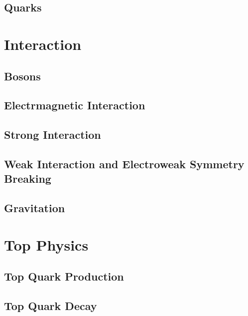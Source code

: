 % 
% 
% 
% 
% 

\subsection{Quarks}


\section{Interaction}
\subsection{Bosons}
\subsection{Electrmagnetic Interaction}
\subsection{Strong Interaction}
\subsection{Weak Interaction and Electroweak Symmetry Breaking}
\subsection{Gravitation}

\section{Top Physics}
\subsection{Top Quark Production}
\subsection{Top Quark Decay}
